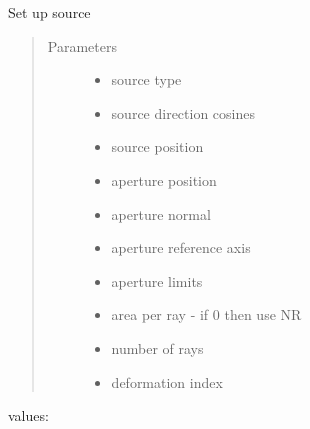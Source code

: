 \documentclass[letterpaper,10pt,english]{sphinxmanual}
\begin{document}
\begin{fulllineitems}
\label{\detokenize{xsrt_functions:xsrt.source}}
Set up source
\begin{quote}\begin{description}
\item[{Parameters}] \leavevmode\begin{itemize}
\item {} 
 \textendash{} source type

\item {} 
 \textendash{} source direction cosines

\item {} 
 \textendash{} source position

\item {} 
 \textendash{} aperture position

\item {} 
 \textendash{} aperture normal

\item {} 
 \textendash{} aperture reference axis

\item {} 
 \textendash{} aperture limits

\item {} 
 \textendash{} area per ray - if 0 then use NR

\item {} 
 \textendash{} number of rays

\item {} 
 \textendash{} deformation index

\end{itemize}

\end{description}\end{quote}
\begin{description}
\item[{ values:}] \leavevmode
{}


\end{description}
\end{fulllineitems}
\end{document}
